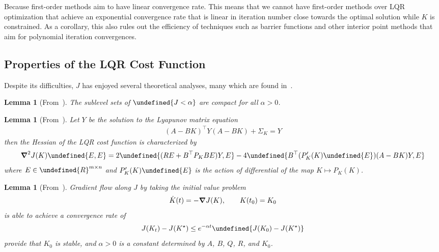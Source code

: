 \documentclass[11pt]{article}  %
\newtheorem{lemma}[theorem]{Lemma}
\let\mbb\undefined
\newcommand{\mbb}[1]{\mathbb{#1}}
\let\brackets\undefined
\newcommand{\brackets}[1]{\left[#1\right]}
\let\braces\undefined
\newcommand{\braces}[1]{\left\{#1\right\}}
\let\angles\undefined
\newcommand{\angles}[1]{\langle#1\rangle}
\begin{document}
Because first-order methods aim to have linear convergence rate.
This means that we cannot have first-order methods over LQR optimization
that achieve an exponential convergence rate that is
linear in iteration number close towards the optimal solution
while \(K\) is constrained.
As a corollary,
this also rules out the efficiency of techniques such as
barrier functions and other interior point methods
that aim for polynomial iteration convergences.



\subsection{Properties of the LQR Cost Function}
Despite its difficulties, \(J\) has enjoyed several
theoretical analyses, many which are found in~\cite{bu2019lqr}.

\begin{lemma}[From~\cite{bu2019lqr}]
  The sublevel sets of \(\braces{J < \alpha}\)
  are compact for all \(\alpha > 0\).
\end{lemma}

\begin{lemma}[From~\cite{bu2019lqr}]
  Let \(Y\) be the solution to the Lyapunov matrix equation
  \begin{align}
    (A - BK)^\top Y (A - BK) + \Sigma_K = Y
  \end{align}
  then the Hessian of the LQR cost function is characterized by
  \begin{align}
    \grad^2 J(K) \brackets{E, E}
      = 2 \angles{(RE + B^\top P_K B E) Y, E}
          - 4 \angles{B^\top (P_K ^\prime (K) \brackets{E}) (A - BK) Y, E}
  \end{align}
  where \(E \in \mbb{R}^{m \times n}\)
  and \(P_K ^\prime (K) \brackets{E}\) is the action of differential
  of the map \(K \mapsto P_K (K)\).
\end{lemma}

\begin{lemma}[From~\cite{bu2019lqr}]
  Gradient flow along \(J\) by taking the initial value problem
  \begin{align}
    \dot{K} (t) = - \grad J(K),
      \qquad
      K(t_0) = K_0
  \end{align}
  is able to achieve a convergence rate of
  \begin{align}
    J(K_t) - J(K^\star) \leq e^{-\alpha t} \brackets{J(K_0) - J(K^\star)}
  \end{align}
  provide that \(K_0\) is stable,
  and \(\alpha > 0\) is a constant determined by
  \(A\), \(B\), \(Q\), \(R\), and \(K_0\).
\end{lemma}
\end{document}
